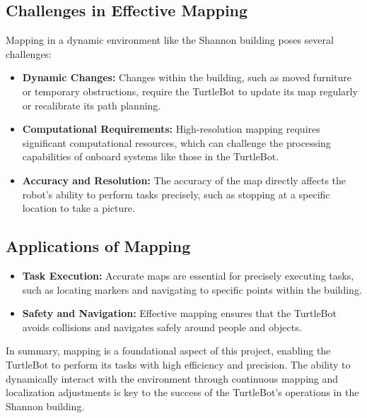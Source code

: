 \documentclass{article}
\begin{document}
	\subsection{Challenges in Effective Mapping}
	Mapping in a dynamic environment like the Shannon building poses several challenges:
	\begin{itemize}
		\item \textbf{Dynamic Changes:} Changes within the building, such as moved furniture or temporary obstructions, require the TurtleBot to update its map regularly or recalibrate its path planning.
		\item \textbf{Computational Requirements:} High-resolution mapping requires significant computational resources, which can challenge the processing capabilities of onboard systems like those in the TurtleBot.
		\item \textbf{Accuracy and Resolution:} The accuracy of the map directly affects the robot's ability to perform tasks precisely, such as stopping at a specific location to take a picture.
	\end{itemize}
	
	\subsection{Applications of Mapping}
	\begin{itemize}
		\item \textbf{Task Execution:} Accurate maps are essential for precisely executing tasks, such as locating markers and navigating to specific points within the building.
		\item \textbf{Safety and Navigation:} Effective mapping ensures that the TurtleBot avoids collisions and navigates safely around people and objects.
	\end{itemize}
	In summary, mapping is a foundational aspect of this project, enabling the TurtleBot to perform its tasks with high efficiency and precision. The ability to dynamically interact with the environment through continuous mapping and localization adjustments is key to the success of the TurtleBot's operations in the Shannon building.
\end{document}
